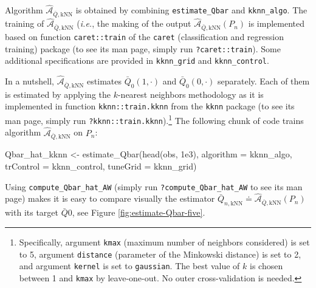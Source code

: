 \documentclass[
  11pt,
  openright,twoside]{book}
\newenvironment{Shaded}{\begin{snugshade}}{\end{snugshade}}
\newcommand{\AttributeTok}[1]{\textcolor[rgb]{0.77,0.63,0.00}{#1}}
\newcommand{\FloatTok}[1]{\textcolor[rgb]{0.00,0.00,0.81}{#1}}
\newcommand{\FunctionTok}[1]{\textcolor[rgb]{0.00,0.00,0.00}{#1}}
\newcommand{\NormalTok}[1]{#1}
\newcommand{\OtherTok}[1]{\textcolor[rgb]{0.56,0.35,0.01}{#1}}
\newcommand{\Algo}{\widehat{\mathcal{A}}}
\newcommand{\defq}{\doteq}
\newcommand{\Qbar}{\bar{Q}}
\theoremstyle{definition}
\theoremstyle{definition}
\theoremstyle{definition}
\theoremstyle{definition}
\theoremstyle{remark}
\begin{document}
Algorithm \(\Algo_{\Qbar,\text{kNN}}\) is obtained by combining \texttt{estimate\_Qbar}
and \texttt{kknn\_algo}. The training of \(\Algo_{\Qbar,\text{kNN}}\) (\emph{i.e.}, the
making of the output \(\Algo_{\Qbar,\text{kNN}} (P_{n})\) is implemented based
on function \texttt{caret::train} of the \texttt{caret} (classification and regression
training) package (to see its man page, simply run \texttt{?caret::train}). Some
additional specifications are provided in \texttt{kknn\_grid} and \texttt{kknn\_control}.

In a nutshell, \(\Algo_{\Qbar,\text{kNN}}\) estimates \(\Qbar_{0}(1,\cdot)\) and
\(\Qbar_{0}(0,\cdot)\) separately. Each of them is estimated by applying the
\(k\)-nearest neighbors methodology as it is implemented in function
\texttt{kknn::train.kknn} from the \texttt{kknn} package (to see its man page, simply run
\texttt{?kknn::train.kknn}).\footnote{Specifically, argument \texttt{kmax} (maximum number of
  neighbors considered) is set to 5, argument \texttt{distance} (parameter of the
  Minkowski distance) is set to 2, and argument \texttt{kernel} is set to \texttt{gaussian}.
  The best value of \(k\) is chosen between 1 and \texttt{kmax} by leave-one-out. No
  outer cross-validation is needed.} The following chunk of code trains
algorithm \(\Algo_{\Qbar,\text{kNN}}\) on \(P_{n}\):

\begin{Shaded}
\begin{Highlighting}[]
\NormalTok{Qbar\_hat\_kknn }\OtherTok{\textless{}{-}} \FunctionTok{estimate\_Qbar}\NormalTok{(}\FunctionTok{head}\NormalTok{(obs, }\FloatTok{1e3}\NormalTok{),}
                               \AttributeTok{algorithm =}\NormalTok{ kknn\_algo,}
                               \AttributeTok{trControl =}\NormalTok{ kknn\_control,}
                               \AttributeTok{tuneGrid =}\NormalTok{ kknn\_grid)}
\end{Highlighting}
\end{Shaded}

Using \texttt{compute\_Qbar\_hat\_AW} (simply run \texttt{?compute\_Qbar\_hat\_AW} to see its man
page) makes it is easy to compare visually the estimator \(\Qbar_{n,\text{kNN}} \defq \Algo_{\Qbar,\text{kNN}}(P_{n})\) with its target \(\Qbar0\), see Figure
\ref{fig:estimate-Qbar-five}.
\end{document}
